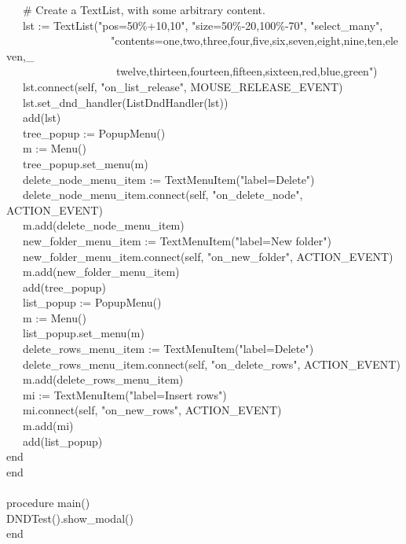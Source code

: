 {\>   \ \ \ \# Create a TextList, with some arbitrary content. \\
\>   \ \ \ lst := TextList("pos=50\%+10,10", "size=50\%-20,100\%-70",
"select\_many", \\
\>   \ \ \ \ \ \ \ \ \ \ \ \ \ \ \ \ \ \ \ "contents=one,two,three,four,five,six,seven,eight,nine,ten,eleven,\_ \\
\>   \ \ \ \ \ \ \ \ \ \ \ \ \ \ \ \ \ \ \ \ twelve,thirteen,fourteen,fifteen,sixteen,red,blue,green") \\
\>   \ \ \ lst.connect(self, "on\_list\_release", MOUSE\_RELEASE\_EVENT) \\
\>   \ \ \ lst.set\_dnd\_handler(ListDndHandler(lst)) \\
\>   \ \ \ add(lst) \\
\>   \ \ \ tree\_popup := PopupMenu() \\
\>   \ \ \ m := Menu() \\
\>   \ \ \ tree\_popup.set\_menu(m) \\
\>   \ \ \ delete\_node\_menu\_item := TextMenuItem("label=Delete") \\
\>   \ \ \ delete\_node\_menu\_item.connect(self, "on\_delete\_node",
                                            ACTION\_EVENT) \\
\>   \ \ \ m.add(delete\_node\_menu\_item) \\
\>   \ \ \ new\_folder\_menu\_item := TextMenuItem("label=New folder") \\
\>   \ \ \ new\_folder\_menu\_item.connect(self, "on\_new\_folder",
                                           ACTION\_EVENT) \\
\>   \ \ \ m.add(new\_folder\_menu\_item) \\
\>   \ \ \ add(tree\_popup) \\
\>   \ \ \ list\_popup := PopupMenu() \\
\>   \ \ \ m := Menu() \\
\>   \ \ \ list\_popup.set\_menu(m) \\
\>   \ \ \ delete\_rows\_menu\_item := TextMenuItem("label=Delete") \\
\>   \ \ \ delete\_rows\_menu\_item.connect(self, "on\_delete\_rows",
                                            ACTION\_EVENT) \\
\>   \ \ \ m.add(delete\_rows\_menu\_item) \\
\>   \ \ \ mi := TextMenuItem("label=Insert rows") \\
\>   \ \ \ mi.connect(self, "on\_new\_rows", ACTION\_EVENT) \\
\>   \ \ \ m.add(mi) \\
\>   \ \ \ add(list\_popup) \\
\>   end \\
end \\
\ \\
procedure main() \\
\>   DNDTest().show\_modal() \\
end
}

